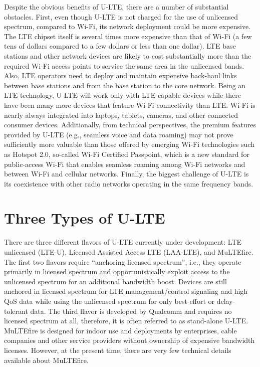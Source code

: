 Despite the obvious benefits of U-LTE, there are a number of substantial obstacles. First, even though U-LTE is not charged for the use of unlicensed spectrum, compared to Wi-Fi, its network deployment could be more expensive. The LTE chipset itself is several times more expensive than that of Wi-Fi (a few tens of dollars compared to a few dollars or less than one dollar). LTE base stations and other network devices are likely to cost substantially more than the required Wi-Fi access points to service the same area in the unlicensed bands.  Also, LTE operators need to deploy and maintain expensive back-haul links between base stations and from the base station to the core network. Being an LTE technology, U-LTE will work only with LTE-capable devices while there have been many more devices that feature Wi-Fi connectivity than LTE. Wi-Fi is nearly always integrated into laptops, tablets, cameras, and other connected consumer devices. Additionally, from technical perspectives, the premium features provided by U-LTE (e.g., seamless voice and data roaming) may not prove sufficiently more valuable than those offered by emerging Wi-Fi technologies such as Hotspot 2.0, so-called Wi-Fi Certified Passpoint, which is a new standard for public-access Wi-Fi that enables seamless roaming among Wi-Fi networks and between Wi-Fi and cellular networks. Finally, the biggest challenge of U-LTE is its coexistence with other radio networks operating in the same frequency bands. 

\section{Three Types of U-LTE}
\label{lte-types}
There are three different flavors of U-LTE currently under development: LTE unlicensed (LTE-U), Licensed Assisted Access LTE (LAA-LTE), and MuLTEfire. The first two flavors require ``anchoring licensed spectrum'', i.e., they operate primarily in licensed spectrum and opportunistically exploit access to the unlicensed spectrum for an additional bandwidth boost. Devices are still anchored in licensed spectrum for LTE management/control signaling and high QoS data while using the unlicensed spectrum for only best-effort or delay-tolerant data. The third flavor is developed by Qualcomm and requires no licensed spectrum at all, therefore, it is often referred to as stand-alone U-LTE. MuLTEfire is designed for indoor use and deployments by enterprises, cable companies and other service providers without ownership of expensive bandwidth licenses. However, at the present time, there are very few technical details available about MuLTEfire.


